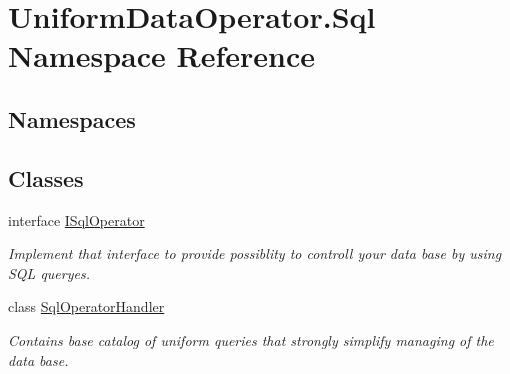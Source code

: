 \hypertarget{namespace_uniform_data_operator_1_1_sql}{}\section{Uniform\+Data\+Operator.\+Sql Namespace Reference}
\label{namespace_uniform_data_operator_1_1_sql}
\subsection*{Namespaces}
\begin{DoxyCompactItemize}
\end{DoxyCompactItemize}
\subsection*{Classes}
\begin{DoxyCompactItemize}
\item 
interface \mbox{\hyperlink{interface_uniform_data_operator_1_1_sql_1_1_i_sql_operator}{I\+Sql\+Operator}}
\begin{DoxyCompactList}\small\item\em Implement that interface to provide possiblity to controll your data base by using S\+QL queryes. \end{DoxyCompactList}\item 
class \mbox{\hyperlink{class_uniform_data_operator_1_1_sql_1_1_sql_operator_handler}{Sql\+Operator\+Handler}}
\begin{DoxyCompactList}\small\item\em Contains base catalog of uniform queries that strongly simplify managing of the data base. \end{DoxyCompactList}\end{DoxyCompactItemize}
